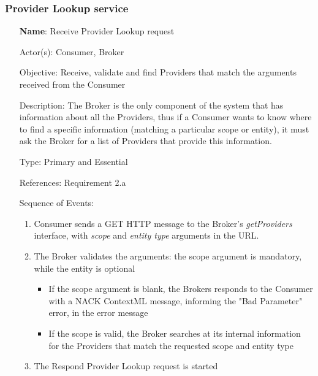 \subsubsection{Provider Lookup service}
\begin{itemize}
	\item[\textbf{Name}:] Receive Provider Lookup request
	\item[Actor(s):] Consumer, Broker
	\item[Objective:] Receive, validate and find Providers that match the arguments received from the Consumer
	\item[Description:] The Broker is the only component of the system that has information about all the Providers, thus if a Consumer wants to know where to find a specific information (matching a particular scope or entity), it must ask the Broker for a list of Providers that provide this information.
	\item[Type:] Primary and Essential
	\item[References:] Requirement 2.a 
	\item[Sequence of Events:]\hfill
	\begin{enumerate}
		\item Consumer sends a GET HTTP message to the Broker's \textit{getProviders} interface, with \textit{scope} and \textit{entity type} arguments in the URL.
		\item The Broker validates the arguments: the scope argument is mandatory, while the entity is optional
		\begin{itemize}
			\item If the scope argument is blank, the Brokers responds to the Consumer with a NACK ContextML message, informing the "Bad Parameter" error, in the error message
			\item If the scope is valid, the Broker searches at its internal information for the Providers that match the requested scope and entity type
		\end{itemize}
		\item The Respond Provider Lookup request is started
	\end{enumerate}
\end{itemize}

